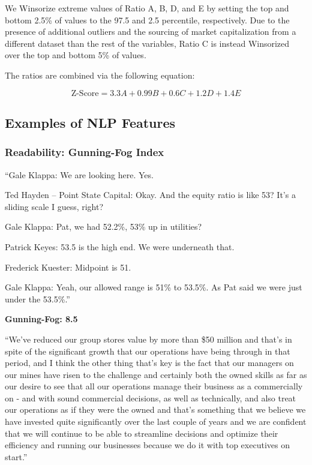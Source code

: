 \documentclass{article}[11pt]
\begin{document}
    We Winsorize extreme values of Ratio A, B, D, and E by setting the top and bottom 2.5\% of values to the 97.5 and 2.5 percentile, respectively. Due to the presence of additional outliers and the sourcing of market capitalization from a different dataset than the rest of the variables, Ratio C is instead Winsorized over the top and bottom 5\% of values. 

    The ratios are combined via the following equation:

    \begin{equation*}
        \text{Z-Score} = 3.3 A + 0.99 B + 0.6 C + 1.2 D + 1.4 E
    \end{equation*}

    \clearpage
    \newpage

    \subsection{Examples of NLP Features}

    \label{sec:nlp-examples}

    \subsubsection{Readability: Gunning-Fog Index}

    \begin{em}
        ``Gale Klappa: We are looking here. Yes.

        Ted Hayden – Point State Capital: Okay. And the equity ratio is like 53? It’s a sliding scale I guess, right?

        Gale Klappa: Pat, we had 52.2\%, 53\% up in utilities?
        
        Patrick Keyes: 53.5 is the high end. We were underneath that.
        
        Frederick Kuester: Midpoint is 51.
        
        Gale Klappa: Yeah, our allowed range is 51\% to 53.5\%. As Pat said we were just under the 53.5\%.''
    \end{em}

    \textbf{Gunning-Fog: 8.5}

    \begin{em}
        ``We've reduced our group stores value by more than \$50 million and that’s in spite of the significant growth that our operations have being through in that period, and I think the other thing that’s key is the fact that our managers on our mines have risen to the challenge and certainly both the owned skills as far as our desire to see that all our operations manage their business as a commercially on - and with sound commercial decisions, as well as technically, and also treat our operations as if they were the owned and that’s something that we believe we have invested quite significantly over the last couple of years and we are confident that we will continue to be able to streamline decisions and optimize their efficiency and running our businesses because we do it with top executives on start.''
    \end{em}
\end{document}
